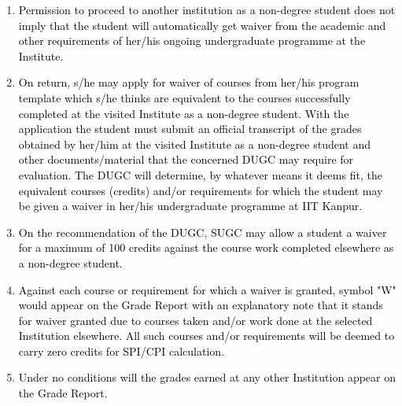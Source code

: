\documentclass[12pt]{article}
\begin{document}
\vspace{\baselineskip}
\begin{enumerate}
	\item {\fontsize{9pt}{10.8pt}\selectfont \textcolor[HTML]{00000A}{Permission to proceed to another institution as a non-degree student does not imply that the student will automatically get waiver from the academic and other requirements of her/his ongoing undergraduate programme at the Institute.}\par}\par


\vspace{\baselineskip}
	\item {\fontsize{10pt}{12.0pt}\selectfont \textcolor[HTML]{00000A}{On return, s/he may apply for waiver of courses from her/his program template which s/he thinks are equivalent to the courses successfully completed at the visited Institute as a non-degree student. With the application the student must submit an official transcript of the grades obtained by her/him at the visited Institute as a non-degree student and other documents/material that the concerned DUGC may require for evaluation. The DUGC will determine, by whatever means it deems fit, the equivalent courses (credits) and/or requirements for which the student may be given a waiver in her/his undergraduate programme at IIT Kanpur.}\par}\par


\vspace{\baselineskip}
	\item {\fontsize{10pt}{12.0pt}\selectfont \textcolor[HTML]{00000A}{On the recommendation of the DUGC, SUGC may allow a student a waiver for a maximum of 100 credits against the course work completed elsewhere as a non-degree student.}\par}\par


\vspace{\baselineskip}
	\item {\fontsize{9pt}{10.8pt}\selectfont \textcolor[HTML]{00000A}{Against each course or requirement for which a waiver is granted, symbol "W" would appear on the Grade Report with an explanatory note that it stands for waiver granted due to courses taken and/or work done at the selected Institution elsewhere. All such courses and/or requirements will be deemed to carry zero credits for SPI/CPI calculation.}\par}\par

	\item {\fontsize{10pt}{12.0pt}\selectfont \textcolor[HTML]{00000A}{Under no conditions will the grades earned at any other Institution appear on the Grade Report.}\par}
\end{enumerate}\par
\end{document}
